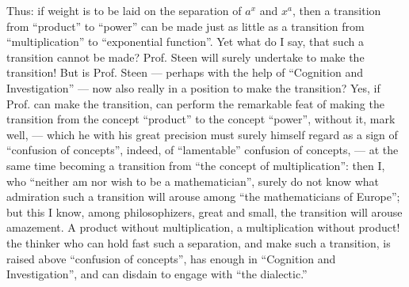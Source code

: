 \documentclass[12pt,a4paper,openany]{book}
\begin{document}
Thus: if weight is to be laid on the separation of $a^{x}$ and
$x^{a}$, then a transition from ``product'' to ``power'' can be made just as
little as a transition from ``multiplication'' to ``exponential function''. Yet what do I say, that such a
transition cannot be made? Prof. Steen will surely undertake
to make the transition! But is Prof. Steen ---
perhaps with the help of ``Cognition and Investigation'' --- now
also really in a position to make the transition? Yes, if
Prof. can make the transition, can perform the remarkable
feat of making the transition from the concept ``product'' to
the concept ``power'', without it, mark well, --- which
he with his great precision must surely himself regard as a sign
of ``confusion of concepts'', indeed, of ``lamentable'' confusion of concepts, --- at the same time becoming a transition from ``the concept of multiplication'': then I, who ``neither am nor wish to be
a mathematician'', surely do not know what admiration such a
transition will arouse among ``the mathematicians of Europe''; but
this I know, among philosophizers, great and small, the
transition will arouse amazement. A product without multiplication, a multiplication without product! the thinker who
can hold fast such a separation, and make such a transition, is raised above ``confusion of concepts'', has enough in ``Cognition and Investigation'', and can disdain to engage
with ``the dialectic.''
\end{document}
